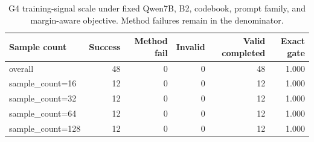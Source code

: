 \begin{table}[t]
\centering
\small
\begin{tabular}{lrrrrr}
\toprule
Sample count & Success & Method fail & Invalid & Valid completed & Exact gate \\
\midrule
overall & 48 & 0 & 0 & 48 & 1.000 \\
sample\_count=16 & 12 & 0 & 0 & 12 & 1.000 \\
sample\_count=32 & 12 & 0 & 0 & 12 & 1.000 \\
sample\_count=64 & 12 & 0 & 0 & 12 & 1.000 \\
sample\_count=128 & 12 & 0 & 0 & 12 & 1.000 \\
\bottomrule
\end{tabular}
\caption{G4 training-signal scale under fixed Qwen7B, B2, codebook, prompt family, and margin-aware objective. Method failures remain in the denominator.}
\end{table}
